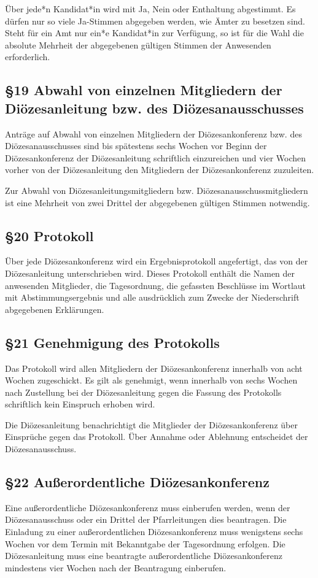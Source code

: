 \documentclass[12pt]{report}
\begin{document}
\begin{flushleft}
Über {\color{red}jede*n Kandidat*in} wird mit Ja, Nein oder Enthaltung abgestimmt. Es dürfen nur so viele Ja-Stimmen
abgegeben werden, wie Ämter zu besetzen sind. Steht für ein Amt nur {\color{red}ein*e Kandidat*in} zur Verfügung, so ist für
die Wahl die absolute Mehrheit der abgegebenen gültigen Stimmen der Anwesenden erforderlich.

\subsection*{§19 Abwahl von einzelnen Mitgliedern der Diözesanleitung bzw. des Diözesanausschusses}
Anträge auf Abwahl von einzelnen Mitgliedern der Diözesankonferenz bzw. des Diözesanausschusses sind
bis spätestens sechs Wochen vor Beginn der Diözesankonferenz der Diözesanleitung schriftlich einzureichen
und vier Wochen vorher von der Diözesanleitung den Mitgliedern der Diözesankonferenz zuzuleiten.

Zur Abwahl von Diözesanleitungsmitgliedern bzw. Diözesanausschussmitgliedern ist eine Mehrheit von zwei
Drittel der abgegebenen gültigen Stimmen notwendig.

\subsection*{§20 Protokoll}
Über jede Diözesankonferenz wird ein Ergebnisprotokoll angefertigt, das von der Diözesanleitung 
unterschrieben wird. Dieses Protokoll enthält die Namen der anwesenden Mitglieder, die Tagesordnung,
die gefassten Beschlüsse im Wortlaut mit Abstimmungsergebnis und alle ausdrücklich zum Zwecke der 
Niederschrift abgegebenen Erklärungen.
\subsection*{§21 Genehmigung des Protokolls}
Das Protokoll wird allen Mitgliedern der Diözesankonferenz innerhalb von acht Wochen zugeschickt. Es gilt
als genehmigt, wenn innerhalb von sechs Wochen nach Zustellung bei der Diözesanleitung gegen die Fassung
des Protokolls schriftlich kein Einspruch erhoben wird.

Die Diözesanleitung benachrichtigt die Mitglieder der Diözesankonferenz über Einsprüche gegen das Protokoll.
Über Annahme oder Ablehnung entscheidet der Diözesanausschuss.
\subsection*{§22 Außerordentliche Diözesankonferenz}
Eine außerordentliche Diözesankonferenz muss einberufen werden, wenn der Diözesanausschuss oder ein
Drittel der Pfarrleitungen dies beantragen. Die Einladung zu einer außerordentlichen Diözesankonferenz
muss wenigstens sechs Wochen vor dem Termin mit Bekanntgabe der Tagesordnung erfolgen.
Die Diözesanleitung muss eine beantragte außerordentliche Diözesankonferenz mindestens vier Wochen
nach der Beantragung einberufen.

\end{flushleft}
\end{document}
